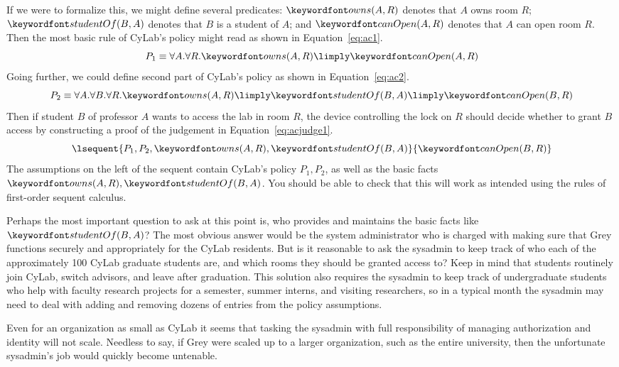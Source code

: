 \documentclass[11pt,twoside]{scrartcl}
\begin{document}
If we were to formalize this, we might define several predicates: $\ownsr(A,R)$ denotes that $A$ owns room $R$; $\studof(B,A)$ denotes that $B$ is a student of $A$; and $\canopen(A,R)$ denotes that $A$ can open room $R$. 
Then the most basic rule of CyLab's policy might read as shown in Equation~\ref{eq:ac1}.
\begin{equation}
\label{eq:ac1}
P_1 \equiv \forall A.\forall R. \ownsr(A,R) \limply \canopen(A,R)
\end{equation}
Going further, we could define second part of CyLab's policy as shown in Equation~\ref{eq:ac2}.
\begin{equation}
\label{eq:ac2}
P_2 \equiv \forall A.\forall B.\forall R. \ownsr(A,R) \limply \studof(B,A) \limply \canopen(B,R)
\end{equation}
Then if student $B$ of professor $A$ wants to access the lab in room $R$, the device controlling the lock on $R$ should decide whether to grant $B$ access by constructing a proof of the judgement in Equation~\ref{eq:acjudge1}.
\begin{equation}
\label{eq:acjudge1}
\lsequent{P_1,P_2,\ownsr(A,R),\studof(B,A)}{\canopen(B,R)}
\end{equation}
The assumptions on the left of the sequent contain CyLab's policy $P_1,P_2$, as well as the basic facts $\ownsr(A,R),\studof(B,A)$. You should be able to check that this will work as intended using the rules of first-order sequent calculus.

Perhaps the most important question to ask at this point is, who provides and maintains the basic facts like $\studof(B,A)$? The most obvious answer would be the system administrator who is charged with making sure that Grey functions securely and appropriately for the CyLab residents. But is it reasonable to ask the sysadmin to keep track of who each of the approximately 100 CyLab graduate students are, and which rooms they should be granted access to? Keep in mind that students routinely join CyLab, switch advisors, and leave after graduation. This solution also requires the sysadmin to keep track of undergraduate students who help with faculty research projects for a semester, summer interns, and visiting researchers, so in a typical month the sysadmin may need to deal with adding and removing dozens of entries from the policy assumptions.

Even for an organization as small as CyLab it seems that tasking the sysadmin with full responsibility of managing authorization and identity will not scale. Needless to say, if Grey were scaled up to a larger organization, such as the entire university, then the unfortunate sysadmin's job would quickly become untenable.
\end{document}
